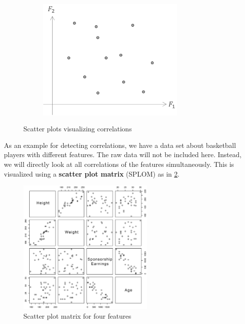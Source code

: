 \begin{figure}[H]
\begin{subfigure}{0.3\textwidth}
    \includegraphics[width=0.8\textwidth]{assets/visualization_and_extraction/feature_relation/scatter_not_cor.png}
  \end{subfigure}
  \caption{Scatter plots visualizing correlations}
  \label{fig:2_correlation}
\end{figure}

As an example for detecting correlations, we have a data set about basketball players with different features. The raw data will not be included here. Instead, we will directly look at all correlations of the features simultaneously. This is visualized using a \textbf{scatter plot matrix} (SPLOM) as in \ref{fig:2_splom}.

\begin{figure}[h]
  \centering
  \includegraphics[width=0.6\textwidth]{assets/visualization_and_extraction/feature_relation/splom.png}
  \caption{Scatter plot matrix for four features}
  \label{fig:2_splom}
\end{figure}

